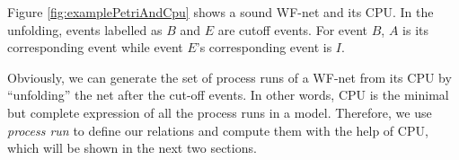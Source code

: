 \documentclass{llncs}
\begin{document}
\begin{example}\label{ex:petriAndCpu}
Figure \ref{fig:examplePetriAndCpu} shows a sound WF-net and its CPU. In the unfolding, events labelled as $B$ and $E$ are cutoff events. For event $B$, $A$ is its corresponding event while event $E$'s corresponding event is $I$.
\end{example}

Obviously, we can generate the set of process runs of a WF-net from its CPU by ``unfolding'' the net after the cut-off events. In other words, CPU is the minimal but complete expression of all the process runs in a model. Therefore, we use \textit{process run} to define our relations and compute them with the help of CPU, which will be shown in the next two sections.


\end{document}
